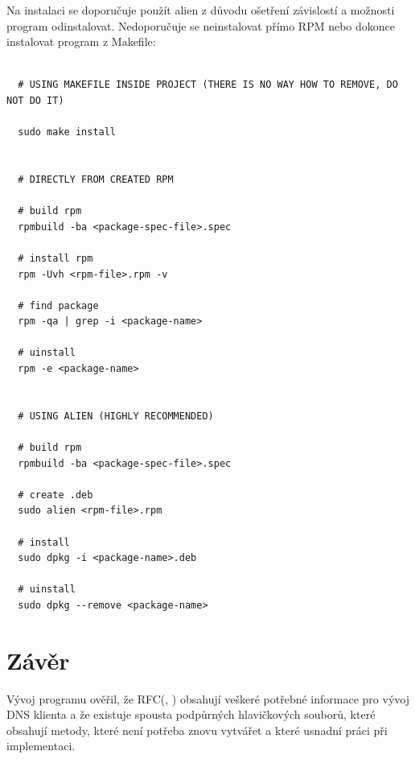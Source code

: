 \documentclass[a4paper,11pt]{article}
\begin{document}
Na instalaci se doporučuje použít alien z důvodu ošetření závislostí a možnosti program odinstalovat. Nedoporučuje se neinstalovat přímo RPM nebo dokonce instalovat program z Makefile:

  \lstset{language=Bash}
  \begin{lstlisting}[frame=single,breaklines]

  # USING MAKEFILE INSIDE PROJECT (THERE IS NO WAY HOW TO REMOVE, DO NOT DO IT)

  sudo make install


  # DIRECTLY FROM CREATED RPM

  # build rpm
  rpmbuild -ba <package-spec-file>.spec

  # install rpm
  rpm -Uvh <rpm-file>.rpm -v

  # find package
  rpm -qa | grep -i <package-name>

  # uinstall
  rpm -e <package-name>


  # USING ALIEN (HIGHLY RECOMMENDED)

  # build rpm
  rpmbuild -ba <package-spec-file>.spec

  # create .deb
  sudo alien <rpm-file>.rpm

  # install
  sudo dpkg -i <package-name>.deb

  # uinstall
  sudo dpkg --remove <package-name>

\end{lstlisting}

\section{Závěr}

Vývoj programu ověřil, že RFC(\cite{rfc10135}, \cite{rfc13596}) obsahují veškeré potřebné informace pro vývoj DNS klienta a že existuje spousta podpůrných hlavičkových souborů, které obsahují metody, které není potřeba znovu vytvářet a které usnadní práci při implementaci.

\newpage




\end{document}

